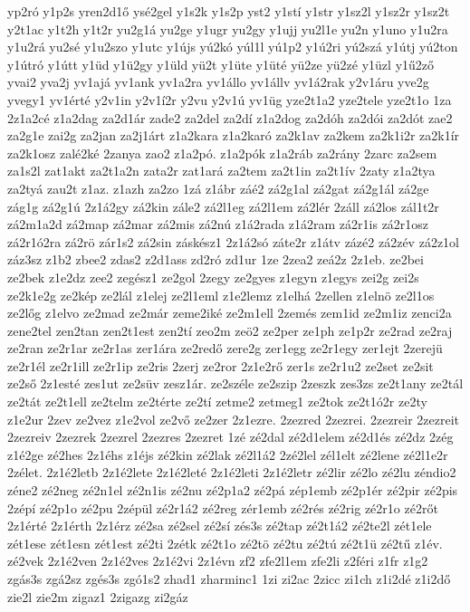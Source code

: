 {yp2ró
y1p2s
yren2d1ő
ysé2gel
y1s2k
y1s2p
yst2
y1stí
y1str
y1sz2l
y1sz2r
y1sz2t
y2t1ac
y1t2h
y1t2r
yu2g1á
yu2ge
y1ugr
yu2gy
y1ujj
yu2l1e
yu2n
y1uno
y1u2ra
y1u2rá
yu2sé
y1u2szo
y1utc
y1újs
yú2kó
yúl1l
yú1p2
y1ú2ri
yú2szá
y1útj
yú2ton
y1útró
y1útt
y1üd
y1ü2gy
y1üld
yü2t
y1üte
y1üté
yü2ze
yü2zé
y1üzl
y1ű2ző
yvai2
yva2j
yv1ajá
yv1ank
yv1a2ra
yv1állo
yv1állv
yv1á2rak
y2v1áru
yve2g
yvegy1
yv1érté
y2v1in
y2v1í2r
y2vu
y2v1ú
yv1üg
yze2t1a2
yze2tele
yze2t1o
1za
2z1a2cé
z1a2dag
za2d1ár
zade2
za2del
za2dí
z1a2dog
za2dóh
za2dói
za2dót
zae2
za2g1e
zai2g
za2jan
za2j1árt
z1a2kara
z1a2karó
za2k1av
za2kem
za2k1i2r
za2k1ír
za2k1osz
zalé2ké
2zanya
zao2
z1a2pó.
z1a2pók
z1a2ráb
za2rány
2zarc
za2sem
za1s2l
zat1akt
za2t1a2n
zata2r
zat1ará
za2tem
za2t1in
za2t1ív
2zaty
z1a2tya
za2tyá
zau2t
z1az.
z1azh
za2zo
1zá
z1ábr
záé2
zá2g1al
zá2gat
zá2g1ál
zá2ge
zág1g
zá2g1ú
2z1á2gy
zá2kin
zále2
zá2l1eg
zá2l1em
zá2lér
2záll
zá2los
zál1t2r
zá2m1a2d
zá2map
zá2mar
zá2mis
zá2nú
z1á2rada
z1á2ram
zá2r1is
zá2r1osz
zá2r1ó2ra
zá2rö
zár1s2
zá2sin
záskész1
2z1á2só
záte2r
z1átv
zázé2
zá2zév
zá2z1ol
záz3sz
z1b2
zbee2
zdas2
z2d1ass
zd2ró
zd1ur
1ze
2zea2
zeá2z
2z1eb.
ze2bei
ze2bek
z1e2dz
zee2
zegész1
ze2gol
2zegy
ze2gyes
z1egyn
z1egys
zei2g
zei2s
ze2k1e2g
ze2kép
ze2lál
z1elej
ze2l1eml
z1e2lemz
z1elhá
2zellen
z1elnö
ze2l1os
ze2lőg
z1elvo
ze2mad
ze2már
zeme2iké
ze2m1ell
2zemés
zem1id
ze2m1iz
zenci2a
zene2tel
zen2tan
zen2t1est
zen2tí
zeo2m
zeö2
ze2per
ze1ph
ze1p2r
ze2rad
ze2raj
ze2ran
ze2r1ar
ze2r1as
zer1ára
ze2redő
zere2g
zer1egg
ze2r1egy
zer1ejt
2zerejü
ze2r1él
ze2r1ill
ze2r1ip
ze2ris
2zerj
ze2ror
2z1e2rő
zer1s
ze2r1u2
ze2set
ze2sit
ze2ső
2z1esté
zes1ut
ze2süv
zesz1ár.
ze2széle
ze2szip
2zeszk
zes3zs
ze2t1any
ze2tál
ze2tát
ze2t1ell
ze2telm
ze2térte
ze2tí
zetme2
zetmeg1
ze2tok
ze2t1ó2r
ze2ty
z1e2ur
2zev
ze2vez
z1e2vol
ze2vő
ze2zer
2z1ezre.
2zezred
2zezrei.
2zezreir
2zezreit
2zezreiv
2zezrek
2zezrel
2zezres
2zezret
1zé
zé2dal
zé2d1elem
zé2d1és
zé2dz
2zég
z1é2ge
zé2hes
2z1éhs
z1éjs
zé2kin
zé2lak
zé2l1á2
2zé2lel
zél1elt
zé2lene
zé2l1e2r
2zélet.
2z1é2letb
2z1é2lete
2z1é2leté
2z1é2leti
2z1é2letr
zé2lir
zé2lo
zé2lu
zéndio2
zéne2
zé2neg
zé2n1el
zé2n1is
zé2nu
zé2p1a2
zé2pá
zép1emb
zé2p1ér
zé2pir
zé2pis
2zépí
zé2p1o
zé2pu
2zépül
zé2r1á2
zé2reg
zér1emb
zé2rés
zé2rig
zé2r1o
zé2rőt
2z1érté
2z1érth
2z1érz
zé2sa
zé2sel
zé2sí
zés3s
zé2tap
zé2t1á2
zé2te2l
zét1ele
zét1ese
zét1esn
zét1est
zé2ti
2zétk
zé2t1o
zé2tö
zé2tu
zé2tú
zé2t1ü
zé2tű
z1év.
zé2vek
2z1é2ven
2z1é2ves
2z1é2vi
2z1évn
zf2
zfe2l1em
zfe2li
z2féri
z1fr
z1g2
zgás3s
zgá2sz
zgés3s
zgó1s2
zhad1
zharminc1
1zi
zi2ac
2zicc
zi1ch
z1i2dé
z1i2dő
zie2l
zie2m
zigaz1
2zigazg
zi2gáz
}
